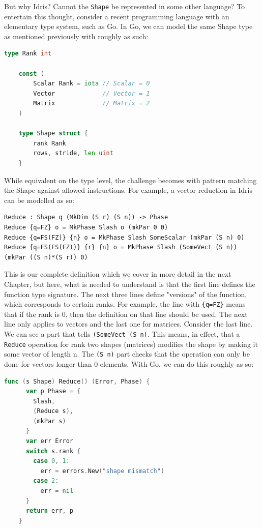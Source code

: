 \documentclass{report}
\begin{document}
But why Idris? Cannot the \verb|Shape| be represented in some other language? To entertain this thought, consider a recent programming language with an elementary type system, such as Go. In Go, we can model the same Shape type as mentioned previously with roughly as such:

\begin{lstlisting}[language=Go]
    type Rank int

    const (
        Scalar Rank = iota // Scalar = 0
        Vector             // Vector = 1
        Matrix             // Matrix = 2
    )

    type Shape struct {
        rank Rank
        rows, stride, len uint
    }
\end{lstlisting}

While equivalent on the type level, the challenge becomes with pattern matching the Shape against allowed instructions. For example, a vector reduction in Idris can be modelled as so:

\begin{verbatim}
Reduce : Shape q (MkDim (S r) (S n)) -> Phase
Reduce {q=FZ} o = MkPhase Slash o (mkPar 0 0)
Reduce {q=FS(FZ)} {n} o = MkPhase Slash SomeScalar (mkPar (S n) 0)
Reduce {q=FS(FS(FZ))} {r} {n} o = MkPhase Slash (SomeVect (S n)) (mkPar ((S n)*(S r)) 0)
\end{verbatim}

This is our complete definition which we cover in more detail in the next Chapter, but here, what is needed to understand is that the first line defines the function type signature. The next three lines define "versions" of the function, which corresponds to certain ranks. For example, the line with \verb|{q=FZ}| means that if the rank is 0, then the definition on that line should be used. The next line only applies to vectors and the last one for matrices. Consider the last line. We can see a part that tells \verb|(SomeVect (S n)|. This means, in effect, that a \verb|Reduce| operation for rank two shapes (matrices) modifies the shape by making it some vector of length n. The \verb|(S n)| part checks that the operation can only be done for vectors longer than 0 elements. With Go, we can do this roughly as so:

\begin{lstlisting}[language=Go]
    func (s Shape) Reduce() (Error, Phase) {
      var p Phase = {
        Slash,
        (Reduce s),
        (mkPar s)
      }
      var err Error
      switch s.rank {
        case 0, 1:
          err = errors.New("shape mismatch")
        case 2:
          err = nil
      }
      return err, p
    }
\end{lstlisting}
\end{document}
